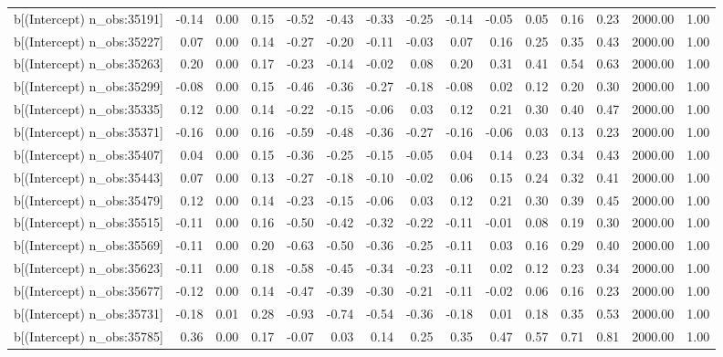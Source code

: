 \begin{table}[ht]
\begin{tabular}{rrrrrrrrrrrrrrr}
  b[(Intercept) n\_obs:35191] & -0.14 & 0.00 & 0.15 & -0.52 & -0.43 & -0.33 & -0.25 & -0.14 & -0.05 & 0.05 & 0.16 & 0.23 & 2000.00 & 1.00 \\ 
  b[(Intercept) n\_obs:35227] & 0.07 & 0.00 & 0.14 & -0.27 & -0.20 & -0.11 & -0.03 & 0.07 & 0.16 & 0.25 & 0.35 & 0.43 & 2000.00 & 1.00 \\ 
  b[(Intercept) n\_obs:35263] & 0.20 & 0.00 & 0.17 & -0.23 & -0.14 & -0.02 & 0.08 & 0.20 & 0.31 & 0.41 & 0.54 & 0.63 & 2000.00 & 1.00 \\ 
  b[(Intercept) n\_obs:35299] & -0.08 & 0.00 & 0.15 & -0.46 & -0.36 & -0.27 & -0.18 & -0.08 & 0.02 & 0.12 & 0.20 & 0.30 & 2000.00 & 1.00 \\ 
  b[(Intercept) n\_obs:35335] & 0.12 & 0.00 & 0.14 & -0.22 & -0.15 & -0.06 & 0.03 & 0.12 & 0.21 & 0.30 & 0.40 & 0.47 & 2000.00 & 1.00 \\ 
  b[(Intercept) n\_obs:35371] & -0.16 & 0.00 & 0.16 & -0.59 & -0.48 & -0.36 & -0.27 & -0.16 & -0.06 & 0.03 & 0.13 & 0.23 & 2000.00 & 1.00 \\ 
  b[(Intercept) n\_obs:35407] & 0.04 & 0.00 & 0.15 & -0.36 & -0.25 & -0.15 & -0.05 & 0.04 & 0.14 & 0.23 & 0.34 & 0.43 & 2000.00 & 1.00 \\ 
  b[(Intercept) n\_obs:35443] & 0.07 & 0.00 & 0.13 & -0.27 & -0.18 & -0.10 & -0.02 & 0.06 & 0.15 & 0.24 & 0.32 & 0.41 & 2000.00 & 1.00 \\ 
  b[(Intercept) n\_obs:35479] & 0.12 & 0.00 & 0.14 & -0.23 & -0.15 & -0.06 & 0.03 & 0.12 & 0.21 & 0.30 & 0.39 & 0.45 & 2000.00 & 1.00 \\ 
  b[(Intercept) n\_obs:35515] & -0.11 & 0.00 & 0.16 & -0.50 & -0.42 & -0.32 & -0.22 & -0.11 & -0.01 & 0.08 & 0.19 & 0.30 & 2000.00 & 1.00 \\ 
  b[(Intercept) n\_obs:35569] & -0.11 & 0.00 & 0.20 & -0.63 & -0.50 & -0.36 & -0.25 & -0.11 & 0.03 & 0.16 & 0.29 & 0.40 & 2000.00 & 1.00 \\ 
  b[(Intercept) n\_obs:35623] & -0.11 & 0.00 & 0.18 & -0.58 & -0.45 & -0.34 & -0.23 & -0.11 & 0.02 & 0.12 & 0.23 & 0.34 & 2000.00 & 1.00 \\ 
  b[(Intercept) n\_obs:35677] & -0.12 & 0.00 & 0.14 & -0.47 & -0.39 & -0.30 & -0.21 & -0.11 & -0.02 & 0.06 & 0.16 & 0.23 & 2000.00 & 1.00 \\ 
  b[(Intercept) n\_obs:35731] & -0.18 & 0.01 & 0.28 & -0.93 & -0.74 & -0.54 & -0.36 & -0.18 & 0.01 & 0.18 & 0.35 & 0.53 & 2000.00 & 1.00 \\ 
  b[(Intercept) n\_obs:35785] & 0.36 & 0.00 & 0.17 & -0.07 & 0.03 & 0.14 & 0.25 & 0.35 & 0.47 & 0.57 & 0.71 & 0.81 & 2000.00 & 1.00 \\ 

\end{tabular}
\end{table}
